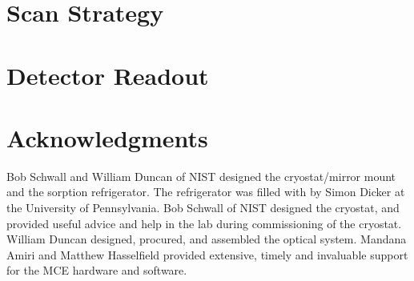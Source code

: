 \section{Scan Strategy}

\section{Detector Readout} \label{sec:det-readout}

\section{Acknowledgments}

Bob Schwall and William Duncan of NIST designed the cryostat/mirror mount and the  sorption refrigerator.
The refrigerator was filled with  by Simon Dicker at the University of Pennsylvania.
Bob Schwall of NIST designed the cryostat, and provided useful advice and help in the lab during commissioning of the cryostat.
William Duncan designed, procured, and assembled the optical system.
Mandana Amiri and Matthew Hasselfield provided extensive, timely and invaluable support for the MCE hardware and software.

